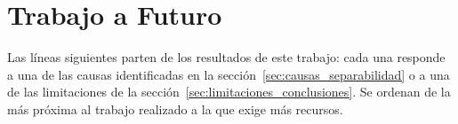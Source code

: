 
\newpage
\section{Trabajo a Futuro}
\label{sec:trabajo_futuro}

Las líneas siguientes parten de los resultados de este trabajo: cada una responde a una de las causas
identificadas en la sección~\ref{sec:causas_separabilidad} o a una de las limitaciones de la
sección~\ref{sec:limitaciones_conclusiones}. Se ordenan de la más próxima al trabajo realizado a la que
exige más recursos.
